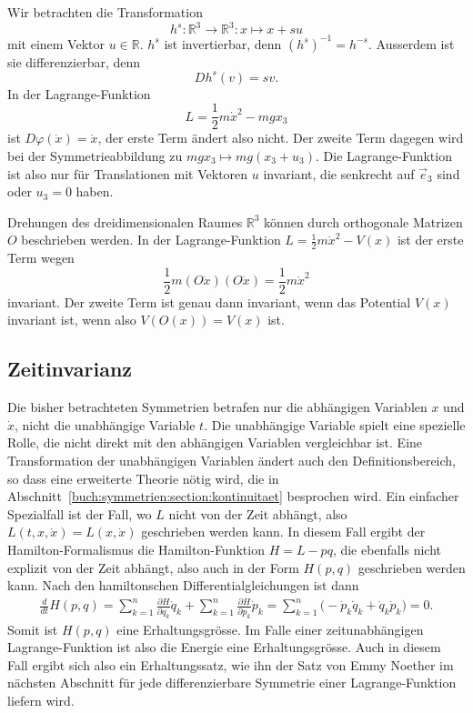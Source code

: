 \begin{beispiel}
\label{buch:symmetrien:symmetrie:beispiel:homogen}
Wir betrachten die Transformation
\[
h^s
\colon
\mathbb{R}^3 \to \mathbb{R}^3
:
x \mapsto x + su
\]
mit einem Vektor $u\in\mathbb{R}$.
$h^s$ ist invertierbar, denn $(h^s)^{-1}=h^{-s}$.
Ausserdem ist sie differenzierbar, denn
\[
Dh^s(v)
=
sv.
\]
In der Lagrange-Funktion
\[
L
=
\frac12m\dot{x}^2 - mgx_3
\]
ist $D\varphi(\dot{x})=\dot{x}$, der erste Term ändert also nicht.
Der zweite Term dagegen wird bei der Symmetrieabbildung zu
$mgx_3\mapsto mg(x_3+u_3)$.
Die Lagrange-Funktion ist also nur für Translationen mit Vektoren $u$
invariant, die senkrecht auf $\vec{e}_3$ sind oder $u_3=0$ haben.
\end{beispiel}

\begin{beispiel}
\label{buch:symmetrien:symmetrie:beispiel:drehung}
Drehungen des dreidimensionalen Raumes $\mathbb{R}^3$ können durch
orthogonale Matrizen $O$ beschrieben werden.
In der Lagrange-Funktion $L=\frac12m\dot{x}^2-V(x)$ ist der erste
Term wegen
\[
\frac12m (O\dot{x})(O\dot{x})
=
\frac12m\dot{x}^2
\]
invariant.
Der zweite Term ist genau dann invariant, wenn das Potential $V(x)$
invariant ist, wenn also $V(O(x))=V(x)$ ist.
\end{beispiel}

%
%
\subsection{Zeitinvarianz}
Die bisher betrachteten Symmetrien betrafen nur die abhängigen
Variablen $x$ und $\dot{x}$, nicht die unabhängige Variable $t$.
Die unabhängige Variable spielt eine spezielle Rolle, die nicht
direkt mit den abhängigen Variablen vergleichbar ist.
Eine Transformation der unabhängigen Variablen ändert auch den
Definitionsbereich, so dass eine erweiterte Theorie nötig wird, 
die in Abschnitt~\ref{buch:symmetrien:section:kontinuitaet}
besprochen wird.
Ein einfacher Spezialfall ist der Fall, wo $L$ nicht von der
Zeit abhängt, also $L(t,x,\dot{x})=L(x,\dot{x})$ geschrieben werden
kann.
In diesem Fall ergibt der Hamilton-Formalismus die Hamilton-Funktion
$H=L-pq$, die ebenfalls nicht explizit von der Zeit abhängt, also
auch in der Form $H(p,q)$ geschrieben werden kann.
Nach den hamiltonschen Differentialgleichungen ist dann
\begin{align*}
\frac{d}{dt}H(p,q)
=
\sum_{k=1}^n
\frac{\partial H}{\partial q_k}\dot{q}_k
+
\sum_{k=1}^n
\frac{\partial H}{\partial p_k}\dot{p}_k
=
\sum_{k=1}^n
\bigl(
-
\dot{p}_k\dot{q}_k
+
\dot{q}_k\dot{p}_k
\bigr)
=
0.
\end{align*}
Somit ist $H(p,q)$ eine Erhaltungsgrösse.
Im Falle einer zeitunabhängigen Lagrange-Funktion ist also die
Energie eine Erhaltungsgrösse.
Auch in diesem Fall ergibt sich also ein Erhaltungssatz, wie ihn
der Satz von Emmy Noether im nächsten Abschnitt für jede differenzierbare
Symmetrie einer Lagrange-Funktion liefern wird.

